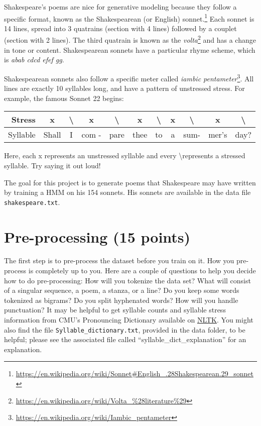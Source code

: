 Shakespeare's poems are nice for generative modeling because they follow a specific format, known as the Shakespearean (or English) sonnet.\footnote{\url{https://en.wikipedia.org/wiki/Sonnet\#English\_.28Shakespearean.29\_sonnet}} Each sonnet is 14 lines, spread into 3 quatrains (section with 4 lines) followed by a couplet (section with 2 lines). The third quatrain is known as the \emph{volta}\footnote{\url{https://en.wikipedia.org/wiki/Volta\_\%28literature\%29}} and has a change in tone or content. Shakespearean sonnets have a particular rhyme scheme, which is \emph{abab cdcd efef gg}.

Shakespearean sonnets also follow a specific meter called \emph{iambic pentameter}\footnote{\url{https://en.wikipedia.org/wiki/Iambic_pentameter}}. All lines are exactly 10 syllables long, and have a pattern of unstressed stress. For example, the famous Sonnet 22 begins:

\begin{table}[H]
    \label{tab:meter}
    \centering

    \begin{tabular}{|r|c|c|c|c|c|c|c|c|c|c|}

    \hline
    Stress & x & \textbackslash & x & \textbackslash & x & \textbackslash & x & \textbackslash & x & \textbackslash \\
    \hline
    Syllable & Shall & I & com - &pare & thee & to & a & sum-&mer's & day?\\
    \hline

    \end{tabular}
\end{table}

Here, each x represents an unstressed syllable and every \textbackslash represents a stressed syllable. Try saying it out loud!

The goal for this project is to generate poems that Shakespeare may have written by training a HMM on his 154 sonnets. His sonnets are available in the data file \texttt{shakespeare.txt}.

\section{Pre-processing (15 points)}

The first step is to pre-process the dataset before you train on it. How you pre-process is completely up to you. Here are a couple of questions to help you decide how to do pre-processing: How will you tokenize the data set? What will consist of a singular sequence, a poem, a stanza, or a line? Do you keep some words tokenized as bigrams? Do you split hyphenated words? How will you handle punctuation? It may be helpful to get syllable counts and syllable stress information from CMU's Pronouncing Dictionary available on \href{https://www.nltk.org/api/nltk.corpus.reader.cmudict.html}{NLTK}. You might also find the file \texttt{Syllable\_dictionary.txt}, provided in the data folder, to be helpful; please see the associated file called ``syllable\_dict\_explanation'' for an explanation.

